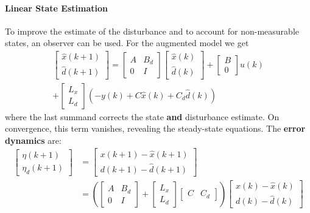 \paragraph{Linear State Estimation}
To improve the estimate of the disturbance and to account for non-measurable states, an observer can be used. For the augmented model we get
    {\small
        \begin{gather*}
            \begin{bmatrix}
                \hat{x}(k + 1) \\
                \hat{d}(k + 1)
            \end{bmatrix}=
            \begin{bmatrix}
                A & B_d \\
                0 & I
            \end{bmatrix}
            \begin{bmatrix}
                \hat{x}(k) \\
                \hat{d}(k)
            \end{bmatrix}
            +\begin{bmatrix}
                B \\
                0
            \end{bmatrix}
            u(k)
            \\
            +\begin{bmatrix}
                L_x \\
                L_d
            \end{bmatrix}
            (-y(k) + C\hat{x}(k) + C_d \hat{d}(k))
        \end{gather*}
    }
where the last summand corrects the state \textbf{and} disturbance estimate. On convergence, this term vanishes, revealing the steady-state equations.
\newpar{}
The \textbf{error dynamics} are:
{\small
\begin{align*}
    \begin{bmatrix}
        \eta(k + 1) \\
        \eta_d (k+1)
    \end{bmatrix}
     & = \begin{bmatrix}
             x(k + 1) - \hat{x}(k + 1) \\
             d(k + 1) - \hat{d}(k + 1)
         \end{bmatrix}
    \\
     & =
    \left(
    \begin{bmatrix}
        A & B_d \\
        0 & I
    \end{bmatrix}
    +
    \begin{bmatrix}
        L_x \\
        L_d
    \end{bmatrix}
    \begin{bmatrix}
        C & C_d
    \end{bmatrix}
    \right)
    \begin{bmatrix}
        x(k) - \hat{x}(k) \\
        d(k) - \hat{d}(k)
    \end{bmatrix}
\end{align*}
}
